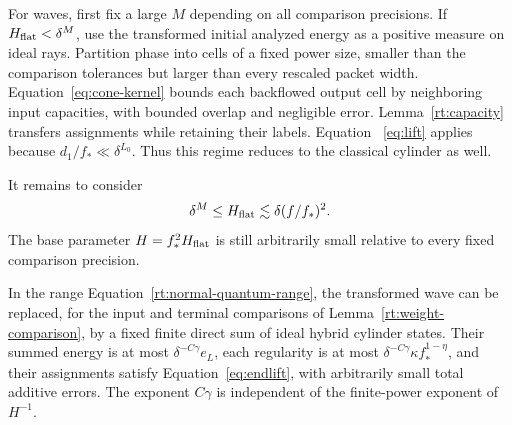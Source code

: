 For waves, first fix a large $M$ depending on all comparison precisions.
If $H_{\rm flat}<\delta^M$, use the transformed initial analyzed energy
as a positive measure on ideal rays.  Partition phase into cells of a
fixed power size, smaller than the comparison tolerances but larger
than every rescaled packet width.  Equation~\eqref{eq:cone-kernel}
bounds each backflowed output cell by neighboring input capacities,
with bounded overlap and negligible error.  Lemma~\ref{rt:capacity}
transfers assignments while retaining their labels.  Equation~
\eqref{eq:lift} applies because $d_1/f_*\ll\delta^{L_0}$.
Thus this regime reduces to the classical cylinder as well.

It remains to consider
\begin{equation}\label{rt:normal-quantum-range}
 \delta^M\le H_{\rm flat}\lesssim\delta(f/f_*)^2.
\end{equation}
The base parameter $H=f_*^2H_{\rm flat}$ is still arbitrarily small
relative to every fixed comparison precision.

\begin{lemma}\label{rt:classical-base}
In the range Equation~\eqref{rt:normal-quantum-range}, the transformed
wave can be replaced, for the input and terminal comparisons of
Lemma~\ref{rt:weight-comparison}, by a fixed finite direct sum of ideal
hybrid cylinder states.  Their summed energy is at most
$\delta^{-C\gamma}e_L$, each regularity is at most
$\delta^{-C\gamma}\kappa f_*^{1-\eta}$, and their assignments
satisfy Equation~\eqref{eq:endlift}, with arbitrarily small total
additive errors.  The exponent $C\gamma$ is independent of the
finite-power exponent of $H^{-1}$.
\end{lemma}

